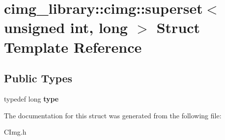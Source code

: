 \hypertarget{structcimg__library_1_1cimg_1_1superset_3_01unsigned_01int_00_01long_01_4}{\section{cimg\-\_\-library\-:\-:cimg\-:\-:superset$<$ unsigned int, long $>$ Struct Template Reference}
\label{structcimg__library_1_1cimg_1_1superset_3_01unsigned_01int_00_01long_01_4}
}
\subsection*{Public Types}
\begin{DoxyCompactItemize}
\item 
\hypertarget{structcimg__library_1_1cimg_1_1superset_3_01unsigned_01int_00_01long_01_4_ad649c8838721231b623ecf64903e084a}{typedef long {\bfseries type}}\label{structcimg__library_1_1cimg_1_1superset_3_01unsigned_01int_00_01long_01_4_ad649c8838721231b623ecf64903e084a}

\end{DoxyCompactItemize}


The documentation for this struct was generated from the following file\-:\begin{DoxyCompactItemize}
\item 
C\-Img.\-h\end{DoxyCompactItemize}

